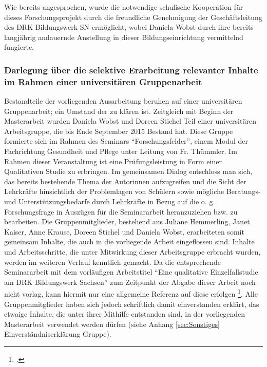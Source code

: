 Wie bereits angesprochen, wurde die notwendige schulische Kooperation für dieses Forschungsprojekt durch die freundliche Genehmigung der Geschäftsleitung des DRK Bildungswerk SN ermöglicht, wobei Daniela Wobst durch ihre bereits langjährig andauernde Anstellung in dieser Bildungseinrichtung vermittelnd fungierte. 

\subsubsection[Selektive Erarbeitung im Rahmen einer universitären Gruppenarbeit]{Darlegung über die selektive Erarbeitung relevanter Inhalte im Rahmen einer universitären Gruppenarbeit}
\label{sec:DarlegungÜberDieSelektiveErarbeitungRelevanterInhalteImRahmenEinerUniversitärenSeminararbeit}

Bestandteile der vorliegenden Ausarbeitung beruhen auf einer universitären Gruppenarbeit; ein Umstand der zu klären ist. Zeitgleich mit Beginn der Masterarbeit wurden Daniela Wobst und Doreen Stichel Teil einer universitären Arbeitsgruppe, die bis Ende September 2015 Bestand hat. Diese Gruppe formierte sich im Rahmen des Seminars "`Forschungsfelder"', einem Modul der Fachrichtung Gesundheit und Pflege unter Leitung von Fr. Thümmler. Im Rahmen dieser Veranstaltung ist eine Prüfungsleistung in Form einer Qualitativen Studie zu erbringen. Im gemeinsamen Dialog entschloss man sich, das bereits bestehende Thema der Autorinnen aufzugreifen und die Sicht der Lehrkräfte hinsichtlich der Problemlagen von Schülern sowie mögliche Beratungs- und Unterstützungsbedarfe durch Lehrkräfte in Bezug auf die o. g. Forschungsfrage in Auszügen für die Seminararbeit heranzuziehen bzw. zu bearbeiten. Die Gruppenmitglieder, bestehend aus Juliane Hemmerling, Janet Kaiser, Anne Krause, Doreen Stichel und Daniela Wobst, erarbeiteten somit gemeinsam Inhalte, die auch in die vorliegende Arbeit eingeflossen sind. Inhalte und Arbeitsschritte, die unter Mitwirkung dieser Arbeitsgruppe erbracht wurden, werden im weiteren Verlauf kenntlich gemacht. Da die entsprechende Seminararbeit mit dem vorläufigen Arbeitstitel "`Eine qualitative Einzelfallstudie am DRK Bildungswerk Sachsen"' zum Zeitpunkt der Abgabe dieser Arbeit noch nicht vorlag, kann hiermit nur eine allgemeine Referenz auf diese erfolgen \footcite{Hemmerling2015}. Alle Gruppenmitglieder haben sich jedoch schriftlich damit einverstanden erklärt, das etwaige Inhalte, die unter ihrer Mithilfe entstanden sind, in der vorliegenden Masterarbeit verwendet werden dürfen (siehe Anhang \ref{sec:Sonstiges} Einverständniserklärung Gruppe).

